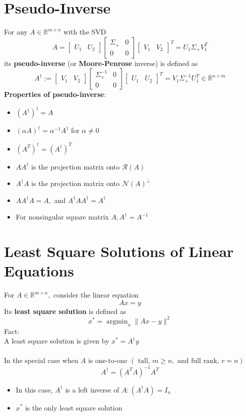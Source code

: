 \documentclass[10pt,a4paper,oneside]{article}
\begin{document}
\section{Pseudo-Inverse}
For any $A \in \mathbb{R}^{m \times n}$ with the SVD
\[
A=\left[\begin{array}{ll}{U_{1}} & {U_{2}}\end{array}\right]\left[\begin{array}{cc}{\Sigma_{+}} & {0} \\ {0} & {0}\end{array}\right]\left[\begin{array}{ll}{V_{1}} & {V_{2}}\end{array}\right]^{T}=U_{1} \Sigma_{+} V_{1}^{T}
\]
its {\bfseries pseudo-inverse} (or {\bfseries Moore-Penrose} inverse) is defined as
\[
A^{\dagger} :=\left[\begin{array}{ll}{V_{1}} & {V_{2}}\end{array}\right]\left[\begin{array}{cc}{\Sigma_{+}^{-1}} & {0} \\ {0} & {0}\end{array}\right]\left[\begin{array}{ll}{U_{1}} & {U_{2}}\end{array}\right]^{T}=V_{1} \Sigma_{+}^{-1} U_{1}^{T} \in \mathbb{R}^{n \times m}
\]
{\bfseries Properties of pseudo-inverse}:
\begin{itemize}
\item $\left(A^{\dagger}\right)^{\dagger}=A$
\item $(\alpha A)^{\dagger}=\alpha^{-1} A^{\dagger}$ for $\alpha \neq 0$
\item $\left(A^{T}\right)^{\dagger}=\left(A^{\dagger}\right)^{T}$
\item $A A^{\dagger}$ is the projection matrix onto $\mathcal{R}(A)$
\item $A^{\dagger} A$ is the projection matrix onto $\mathcal{N}(A)^{\perp}$
\item $A A^{\dagger} A=A,$ and $A^{\dagger} A A^{\dagger}=A^{\dagger}$
\item For nonsingular square matrix $A, A^{\dagger}=A^{-1}$
\end{itemize}
\section{Least Square Solutions of Linear Equations}
For $A \in \mathbb{R}^{m \times n},$ consider the linear equation
\[
A x=y
\]
Its {\bfseries least square solution} is defined as
\[
x^{*}=\operatorname{argmin}_{x}\|A x-y\|^{2}
\]
Fact:\\
A least square solution is given by $x^{*}=A^{\dagger} y$\\
\\
In the special case when $A$ is one-to-one $(\text { tall, } m \geq n, \text { and full rank, } r=n)$
\[
A^{\dagger}=\left(A^{T} A\right)^{-1} A^{T}
\]
\begin{itemize}
\item In this case, $A^{\dagger}$ is a left inverse of $A :\left(A^{\dagger} A\right)=I_{n}$
\item $x^{*}$ is the only least square solution
\end{itemize}
\end{document}
